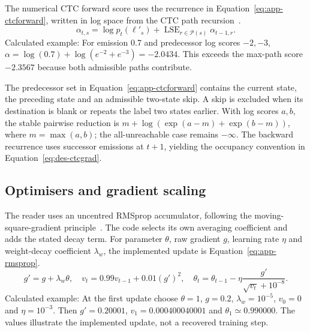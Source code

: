 The numerical CTC forward score uses the recurrence in Equation~\ref{eq:app-ctcforward}, written in log space from the CTC path recursion~\cite[PDF p.~4, Sec.~4.1]{graves2006}.
\begin{equation}
\alpha_{t,s}=\log p_t(\ell'_s)+
\operatorname{LSE}_{r\in\mathcal P(s)}\alpha_{t-1,r}.
\label{eq:app-ctcforward}
\end{equation}
Calculated example: For emission 0.7 and predecessor log scores $-2,-3$, $\alpha=\log(0.7)+\log(e^{-2}+e^{-3})=-2.0434$. This exceeds the max-path score $-2.3567$ because both admissible paths contribute. \cite[train.py, CtcLoss]{braunepipeline2026}

The predecessor set in Equation~\ref{eq:app-ctcforward} contains the current state, the preceding state and an admissible two-state skip. A skip is excluded when its destination is blank or repeats the label two states earlier. With log scores $a,b$, the stable pairwise reduction is $m+\log(\exp(a-m)+\exp(b-m))$, where $m=\max(a,b)$; the all-unreachable case remains $-\infty$. The backward recurrence uses successor emissions at $t+1$, yielding the occupancy convention in Equation~\ref{eq:des-ctcgrad}.~\cite[train.py; segment.py; style.py]{braunepipeline2026}

\subsection{Optimisers and gradient scaling}
The reader uses an uncentred RMSprop accumulator, following the moving-square-gradient principle~\cite[PDF p.~29]{tieleman2012}. The code selects its own averaging coefficient and adds the stated decay term. For parameter $\theta$, raw gradient $g$, learning rate $\eta$ and weight-decay coefficient $\lambda_w$, the implemented update is Equation~\ref{eq:app-rmsprop}.
\begin{equation}
g' =g+\lambda_w\theta,\quad
v_t=0.99v_{t-1}+0.01(g')^2,\quad
\theta_t=\theta_{t-1}-\eta\frac{g'}{\sqrt{v_t}+10^{-8}}.
\label{eq:app-rmsprop}
\end{equation}
Calculated example: At the first update choose $\theta=1$, $g=0.2$, $\lambda_w=10^{-5}$, $v_0=0$ and $\eta=10^{-3}$. Then $g\prime=0.20001$, $v_1=0.000400040001$ and $\theta_1\simeq0.990000$. The values illustrate the implemented update, not a recovered training step. \cite[train.py, RMSprop]{braunepipeline2026}

